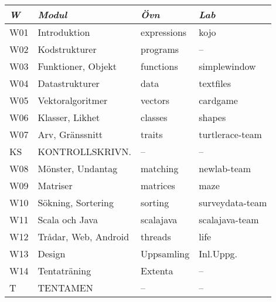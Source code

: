 \begin{tabular}{l|l|l|l}
\textit{W} & \textit{Modul} & \textit{Övn} & \textit{Lab} \\ \hline \hline
W01 & Introduktion         & expressions & kojo            \\
W02 & Kodstrukturer        & programs    & --              \\
W03 & Funktioner, Objekt   & functions   & simplewindow    \\
W04 & Datastrukturer       & data        & textfiles       \\
W05 & Vektoralgoritmer     & vectors     & cardgame        \\
W06 & Klasser, Likhet      & classes     & shapes          \\
W07 & Arv, Gränssnitt      & traits      & turtlerace-team \\
KS  & KONTROLLSKRIVN.      & --          & --              \\
W08 & Mönster, Undantag    & matching    & newlab-team     \\
W09 & Matriser             & matrices    & maze            \\
W10 & Sökning, Sortering   & sorting     & surveydata-team \\
W11 & Scala och Java       & scalajava   & scalajava-team  \\
W12 & Trådar, Web, Android & threads     & life            \\
W13 & Design               & Uppsamling  & Inl.Uppg.       \\
W14 & Tentaträning         & Extenta     & --              \\
T   & TENTAMEN             & --          & --              \\
\end{tabular}
